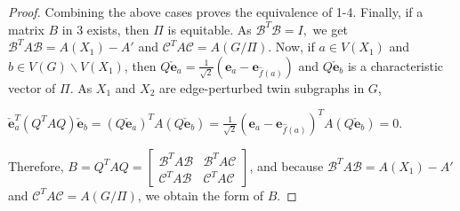 \documentclass[12pt,a4paper]{article}
\def \e {{\bf e}}
\def \e {{\mathbf e}}
\newcommand{\ob}[1]{\left(#1\right)}
\begin{document}
\begin{proof}
Combining the above cases proves the equivalence of 1-4. Finally, if a matrix $B$ in 3 exists, then $\Pi$ is equitable. As $\mathcal{B}^T\mathcal{B}=I,$ we get $\mathcal{B}^TA\mathcal{B}=A(X_1)-A'$ and $\mathcal{C}^TA\mathcal{C}=A(G/\Pi).$ Now, if $a\in V(X_1)$ and $b\in V(G)\backslash V(X_1)$, then $Q\check{\e}_a= \frac{1}{\sqrt{2}}\ob{\e_a-\e_{\hat{f}(a)}}$ and $Q\check{\e}_b$ is a characteristic vector of $\Pi$. As $X_1$ and $X_2$ are edge-perturbed twin subgraphs in $G$,
\begin{center}
$\check{\e}_a^T(Q^TAQ)\check{\e}_b=(Q\check{\e}_a)^TA(Q\check{\e}_b)=\frac{1}{\sqrt{2}}\ob{\e_a-\e_{\hat{f}(a)}}^TA(Q\check{\e}_b)=0.$
\end{center} 
Therefore, $B=Q^TAQ=\begin{bmatrix} \mathcal{B}^TA\mathcal{B} & \mathcal{B}^TA\mathcal{C}\\ \mathcal{C}^TA\mathcal{B} & \mathcal{C}^TA\mathcal{C}\end{bmatrix}$, and because $\mathcal{B}^TA\mathcal{B}=A(X_1)-A'$ and $\mathcal{C}^TA\mathcal{C}=A(G/\Pi)$, we obtain the form of $B.$
\end{proof}
\end{document}
